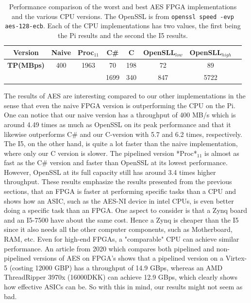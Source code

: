 \documentclass[a4paper, openany]{book}
\begin{document}
\begin{abstact}
\begin{table}[H]
\centering
\captionsetup{width=.8\linewidth}
\begin{tabular}{c c c c c c c c}
\hline
\textbf{Version} & Naive & Proc$_{11}$ & C\# & C & OpenSLL$_{low}$ & OpenSLL$_{high}$\\
\hline
\textbf{TP(MBps)} & 400 & 1963 &    70& 198 & 72  & 89\\
                  &     &      & 1699 & 340 & 847 & 5722
\end{tabular}
\caption[AES: FPGA and CPU comparisons]%
{Performance comparison of the worst and best AES FPGA implementations and the various CPU versions. The OpenSSL is from \texttt{openssl speed -evp aes-128-ecb}. Each of the CPU implementations has two values, the first being the Pi results and the second the I5 results.}
\label{tab:AEScompare}
\end{table}
The results of AES are interesting compared to our other implementations in the sense that even the naive FPGA version is outperforming the CPU on the Pi. One can notice that our naive version has a throughput of 400 MB/s which is around 4.49 times as much as OpenSSL on its peak performance and that it likewise outperforms C\# and our C-version with 5.7 and 6.2 times, respectively. The I5, on the other hand, is quite a lot faster than the naive implementation, where only our C version is slower. The pipelined version *Proc*\(_{11}\) is almost as fast as the C\# version and faster than OpenSSL at its lowest performance. However, OpenSSL at its full capacity still has around 3.4 times higher throughput. These results emphasize the results presented from the previous sections, that an FPGA is faster at performing specific tasks than a CPU and shows how an ASIC, such as the AES-NI device in intel CPUs, is even better doing a specific task than an FPGA. One aspect to consider is that a Zynq board and an I5-7500 have about the same cost. Hence a Zynq is cheaper than the I5 since it also needs all the other computer components, such as Motherboard, RAM, etc.
Even for high-end FPGAs, a "comparable" CPU can achieve similar performance.
An article from 2020 which compares both pipelined and non-pipelined versions of AES on FPGA's shows that a pipelined version on a Virtex-5 (costing 12000 GBP) has a throughput of 14.9 GBps\cite{Zodpe}, whereas an AMD ThreadRipper 3970x (16000DKK) can achieve 12.9 GBps, which clearly shows how effective ASICs can be. So with this in mind, our results might not seem as bad.


\end{abstact}
\end{document}
